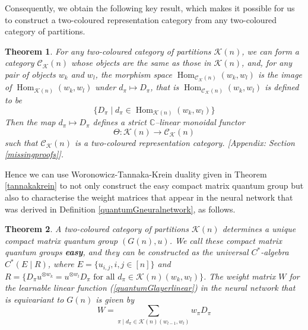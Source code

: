 \documentclass{article}
\DeclareMathOperator{\Hom}{Hom}
\theoremstyle{plain}
\newtheorem{theorem}{Theorem}[section]
\theoremstyle{definition}
\theoremstyle{remark}
\begin{document}
Consequently, we obtain the following key result,
which makes it possible for us to construct a two-coloured representation category
from any two-coloured category of partitions.

\begin{theorem} 
	\label{quantumpartfunctor}
	For any two-coloured category of partitions $\mathcal{K}(n)$,
	we can form a category $\mathcal{C}_{\mathcal{K}}(n)$
	whose objects are the same as those in $\mathcal{K}(n)$,
	and, for any pair of objects $w_k$ and $w_l$,
	the morphism space $\Hom_{\mathcal{C}_{\mathcal{K}}(n)}(w_k,w_l)$
	is the image of $\Hom_{\mathcal{K}(n)}(w_k,w_l)$
	under $d_\pi \mapsto D_\pi$, that is
	$\Hom_{\mathcal{C}_{\mathcal{K}}(n)}(w_k,w_l)$ is defined to be
	\begin{equation} \label{easyspanningset}
		\{D_\pi \mid d_\pi \in \Hom_{\mathcal{K}(n)}(w_k,w_l)\}
	\end{equation}
	Then the map $d_\pi \mapsto D_\pi$ defines a 
	strict $\mathbb{C}$--linear monoidal functor
	\begin{equation} \label{qufunctor}
		\Theta : \mathcal{K}(n) \rightarrow \mathcal{C}_{\mathcal{K}}(n)
	\end{equation}
	such that $\mathcal{C}_{\mathcal{K}}(n)$ is a two-coloured representation category.
	[Appendix: Section \ref{missingproofs}].
\end{theorem}



Hence we can use Woronowicz-Tannaka-Krein duality given in Theorem \ref{tannakakrein}
to not only construct the easy compact matrix quantum group but also to characterise
the weight matrices that appear in the neural network that was derived in Definition
\ref{quantumGneuralnetwork}, as follows.

\begin{theorem} \label{easycstar}
	A two-coloured category of partitions 
	$\mathcal{K}(n)$
	determines a unique compact matrix quantum group $(G(n), u)$.
	We call these compact matrix quantum groups \textbf{easy},
	and they can be constructed as the universal $C^{*}$-algebra
	$C^{*}(E \mid R)$, where $E = \{u_{i,j}, i,j \in [n]\}$ and
	$R = \{D_\pi{u^{\otimes w_k}} = {u^{\otimes w_l}}D_\pi 
		\text{ for all } d_\pi \in \mathcal{K}(n)(w_k,w_l)\}$.
	The weight matrix $W$ for the learnable linear function 
	(\ref{quantumGlayerlinear})	
	in the neural network that is equivariant to $G(n)$ is given by
	\begin{equation} \label{cmqgweightmatrix}
		W = \sum_{\pi \mid d_\pi \in \mathcal{K}(n)(w_{l-1},w_l)} w_\pi D_\pi
	\end{equation}
\end{theorem}
\end{document}
